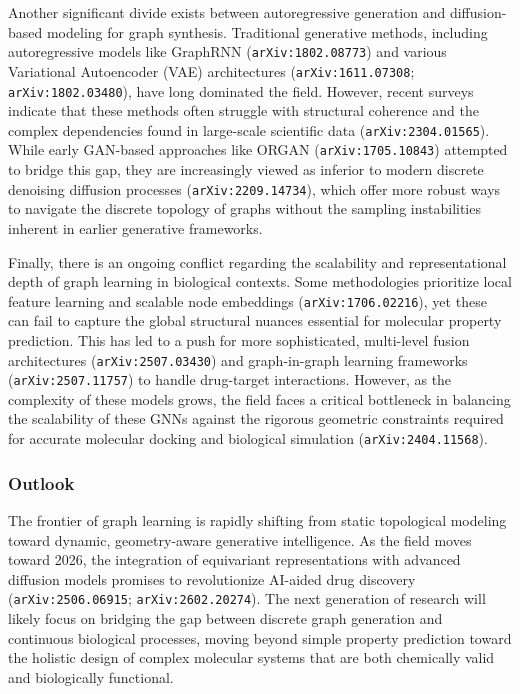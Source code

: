 \documentclass[11pt]{article}
\begin{document}
Another significant divide exists between autoregressive generation and diffusion-based modeling for graph synthesis. Traditional generative methods, including autoregressive models like GraphRNN (\texttt{arXiv:1802.08773}) and various Variational Autoencoder (VAE) architectures (\texttt{arXiv:1611.07308}; \texttt{arXiv:1802.03480}), have long dominated the field. However, recent surveys indicate that these methods often struggle with structural coherence and the complex dependencies found in large-scale scientific data (\texttt{arXiv:2304.01565}). While early GAN-based approaches like ORGAN (\texttt{arXiv:1705.10843}) attempted to bridge this gap, they are increasingly viewed as inferior to modern discrete denoising diffusion processes (\texttt{arXiv:2209.14734}), which offer more robust ways to navigate the discrete topology of graphs without the sampling instabilities inherent in earlier generative frameworks.

Finally, there is an ongoing conflict regarding the scalability and representational depth of graph learning in biological contexts. Some methodologies prioritize local feature learning and scalable node embeddings (\texttt{arXiv:1706.02216}), yet these can fail to capture the global structural nuances essential for molecular property prediction. This has led to a push for more sophisticated, multi-level fusion architectures (\texttt{arXiv:2507.03430}) and graph-in-graph learning frameworks (\texttt{arXiv:2507.11757}) to handle drug-target interactions. However, as the complexity of these models grows, the field faces a critical bottleneck in balancing the scalability of these GNNs against the rigorous geometric constraints required for accurate molecular docking and biological simulation (\texttt{arXiv:2404.11568}).

\subsubsection{Outlook}

The frontier of graph learning is rapidly shifting from static topological modeling toward dynamic, geometry-aware generative intelligence. As the field moves toward 2026, the integration of equivariant representations with advanced diffusion models promises to revolutionize AI-aided drug discovery (\texttt{arXiv:2506.06915}; \texttt{arXiv:2602.20274}). The next generation of research will likely focus on bridging the gap between discrete graph generation and continuous biological processes, moving beyond simple property prediction toward the holistic design of complex molecular systems that are both chemically valid and biologically functional.
\end{document}
